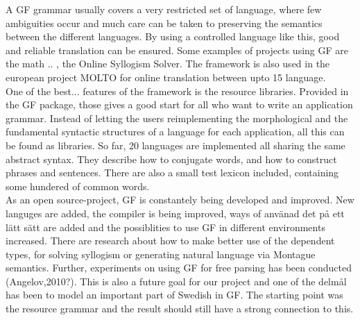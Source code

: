 \documentclass{report}
\begin{document}
A GF grammar usually covers a very restricted set of language, where few ambiguities
occur and much care can be taken to preserving the semantics between the different languages.
By using a controlled language like this,  good and reliable translation can be
ensured. Some examples of projects using GF are the math .. \cite{olga}, the
Online Syllogism Solver\cite{malin!}.  The framework is also used in the
european project MOLTO for online translation between upto 15 language.\\

One of the best... features of the framework is the resource libraries. Provided in the 
GF package, those gives a good start for all who want to write an application grammar.
Instead of letting the users reimplementing the morphological and the fundamental
syntactic structures of a language for each application, all this can be found
as libraries. So far, 20 languages are implemented all sharing the same abstract syntax.
They describe how to conjugate words, and how to construct phrases and sentences.
There are also a small test lexicon included, containing some hundered of common words.\\

As an open source-project, GF is constantely being developed and improved. New
languges are added, the compiler is being improved, ways of använad det på ett
lätt sätt are added and the possiblities to use GF in different environments
increased. There are  research about how to make better use of the dependent
types, for solving syllogism or generating natural language via Montague
semantics.
Further, experiments on using GF for free parsing has been conducted (Angelov,2010?).
This is also a future goal for our project and one of the delmål has been to
model an important part of Swedish in GF. The starting point was the resource
grammar and the result should still have a strong connection to this.

%
%
\end{document}
